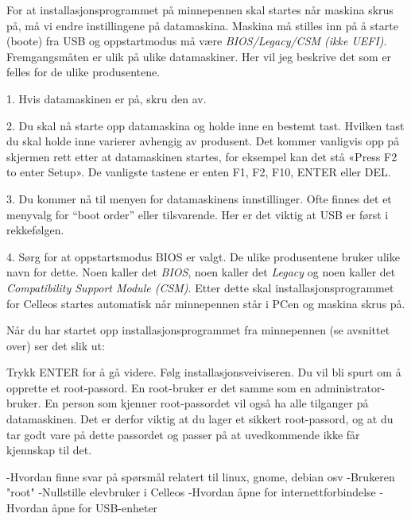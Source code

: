
For at installasjonsprogrammet p\aa{} minnepennen skal startes n\aa r maskina skrus p\aa , m\aa{} vi endre instillingene p\aa{} datamaskina. Maskina m\aa{} stilles inn p\aa{} \aa{} starte (boote) fra USB og oppstartmodus m\aa{} v\ae re {\it BIOS/Legacy/CSM (ikke UEFI)}. Fremgangsm\aa ten er ulik p\aa{} ulike datamaskiner. Her vil jeg beskrive det som er felles for de ulike produsentene. 
\item{1.} Hvis datamaskinen er p\aa, skru den av.
\item{2.} Du skal n\aa{} starte opp datamaskina og holde inne en bestemt tast. Hvilken tast du skal holde inne varierer avhengig av produsent. Det kommer vanligvis opp p\aa{} skjermen rett etter at datamaskinen startes, for eksempel kan det st\aa{} «Press F2 to enter Setup». De vanligste tastene er enten F1, F2, F10, ENTER eller DEL.
\item{3.} Du kommer n\aa{} til menyen for datamaskinens innstillinger. Ofte finnes det et menyvalg for ``boot order'' eller tilsvarende. Her er det viktig at USB er f\o rst i rekkef\o lgen.
\item{4.} S\o rg for at oppstartsmodus BIOS er valgt. De ulike produsentene bruker ulike navn for dette. Noen kaller det {\it BIOS}, noen kaller det {\it Legacy} og noen kaller det {\it Compatibility Support Module (CSM)}. 
Etter dette skal installasjonsprogrammet for Celleos startes automatisk n\aa r minnepennen st\aa r i PCen og maskina skrus p\aa.



N\aa r du har startet opp installasjonsprogrammet fra minnepennen (se avsnittet over) ser det slik ut:

\centerline{
\epsfxsize 9cm
}

Trykk ENTER for \aa{} g\aa{} videre.
F\o lg installasjonsveiviseren. Du vil bli spurt om \aa{} opprette et root-passord. En root-bruker er det samme som en administrator-bruker. En person som kjenner root-passordet vil ogs\aa{} ha alle tilganger p\aa{} datamaskinen. Det er derfor viktig at du lager et sikkert root-passord, og at du tar godt vare p\aa{} dette passordet og passer p\aa{} at uvedkommende ikke f\aa r kjennskap til det. 




-Hvordan finne svar p\aa{} sp\o rsm\aa l relatert til linux, gnome, debian osv
-Brukeren "root"
-Nullstille elevbruker i Celleos
-Hvordan \aa pne for internettforbindelse
-Hvordan \aa pne for USB-enheter

\vfill\eject\bye
